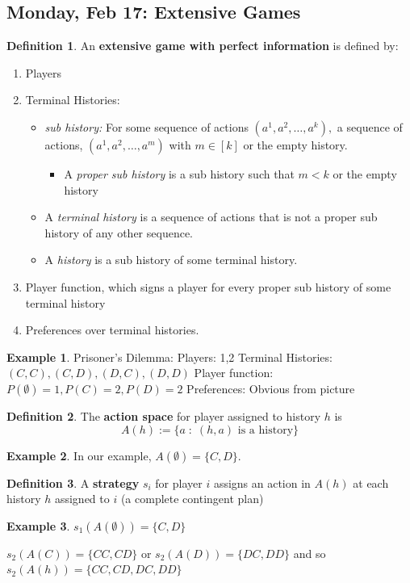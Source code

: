 \documentclass[10pt, oneside]{article}
\theoremstyle{definition}
\newtheorem{exmp}{Example}[section]
\newtheorem{defn}{Definition}
\begin{document}
\newpage
\subsection{Monday, Feb 17: Extensive Games}

\begin{defn}
    An \textbf{extensive game with perfect information} is defined by:
    \begin{enumerate}
        \item Players
        \item Terminal Histories:
        \begin{itemize}
            \item \textit{sub history:} For some sequence of actions $(a^{1}, a^{2}, \dots, a^k),$ a sequence of actions, $(a^{1}, a^{2}, \dots, a^m)$ with $m\in [k]$ or the empty history.
            \begin{itemize}
                \item A \textit{proper sub history} is a sub history such that $m<k$ or the empty history
            \end{itemize}
            \item A \textit{terminal history} is a sequence of actions that is not a proper sub history of any other sequence.
            \item A \textit{history} is a sub history of some terminal history.
        \end{itemize}
        \item Player function, which signs a player for every proper sub history of some terminal history
        \item Preferences over terminal histories.
    \end{enumerate}
\end{defn}

\begin{exmp}
    Prisoner's Dilemma:
    Players: 1,2
    Terminal Histories: $(C,C), (C,D), (D, C), (D,D)$
    Player function: $P(\emptyset) = 1, P(C) = 2, P(D) = 2$
    Preferences: Obvious from picture
\end{exmp}
\begin{defn}
    The \textbf{action space} for player assigned to history $h$ is 
    \[A(h):= \{a \; : \; (h,a) \text{ is a history}\}\]
\end{defn}
\begin{exmp}
    In our example, $A(\emptyset) = \{C, D\}.$
\end{exmp}
\begin{defn}
    A \textbf{strategy} $s_i$ for player $i$ assigns an action in $A(h)$ at each history $h$ assigned to $i$ (a complete contingent plan)
\end{defn}
\begin{exmp}
    $s_1(A(\emptyset)) = \{C,D\}$

    
    $s_2(A(C)) = \{CC, CD\}$ or $s_2(A(D)) = \{DC, DD\}$  and so $s_2(A(h)) = \{CC, CD, DC, DD\}$
\end{exmp}
\end{document}
